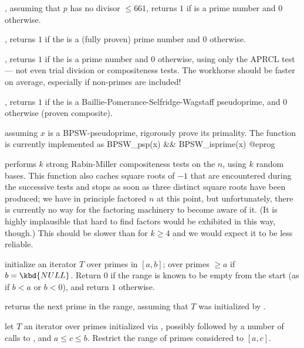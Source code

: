 , assuming that $p$ has no divisor $\leq
661$, returns $1$ if  is a prime number and $0$ otherwise.

, returns $1$ if the   is a
(fully proven) prime number and $0$ otherwise.

, returns $1$ if the   is a
prime number and $0$ otherwise, using only the APRCL test --- not even trial
division or compositeness tests. The workhorse  should be
faster on average, especially if non-primes are included!

, returns $1$ if the   is a
Baillie-Pomerance-Selfridge-Wagstaff pseudoprime, and $0$ otherwise (proven
composite).

 assuming $x$ is a BPSW-pseudoprime, rigorously
prove its primality. The function  is currently implemented
as
\bprog
 BPSW_psp(x) && BPSW_isprime(x)
@eprog

 performs $k$ strong Rabin-Miller
compositeness tests on the  $n$, using $k$ random bases. This
function also caches square roots of $-1$ that are encountered during the
successive tests and stops as soon as three distinct square roots have been
produced; we have in principle factored $n$ at this point, but
unfortunately, there is currently no way for the factoring machinery to
become aware of it. (It is highly implausible that hard to find factors
would be exhibited in this way, though.) This should be slower than
 for $k\geq 4$ and we would expect it to be less reliable.


 initialize an
iterator $T$ over primes in $[a,b]$; over primes $\geq a$ if $b =
\kbd{NULL}$. Return $0$ if the range is known to be empty from the start
(as if $b < a$ or $b < 0$), and return $1$ otherwise.

 returns the next prime in the range,
assuming that $T$ was initialized by .



 let $T$ an iterator
over primes initialized via , possibly
followed by a number of calls to , and $a \leq c \leq
b$. Restrict the range of primes considered to $[a,c]$.


